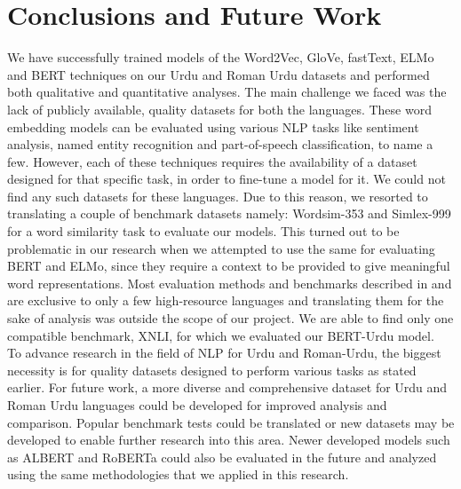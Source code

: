 \documentclass[format=acmsmall,review=true,screen=true]{acmart}
\begin{document}
    \section{Conclusions and Future Work}
   We have successfully trained models of the Word2Vec, GloVe, fastText, ELMo and BERT techniques on our Urdu and Roman Urdu datasets and performed both qualitative and quantitative analyses. The main challenge we faced was the lack of publicly available, quality datasets for both the languages. These word embedding models can be evaluated using various NLP tasks like sentiment analysis, named entity recognition and part-of-speech classification, to name a few. However, each of these techniques requires the availability of a dataset designed for that specific task, in order to fine-tune a model for it. We could not find any such datasets for these languages. Due to this reason, we resorted to translating a couple of benchmark datasets namely: Wordsim-353 and Simlex-999 for a word similarity task to evaluate our models. This turned out to be problematic in our research when we attempted to use the same for evaluating BERT and ELMo, since they require a context to be provided to give meaningful word representations. Most evaluation methods and benchmarks described in \cite{devlin2018bert} and \cite{peters2018deep}  are exclusive to only a few high-resource languages and translating them for the sake of analysis was outside the scope of our project. We are able to find only one compatible benchmark, XNLI, for which we evaluated our BERT-Urdu model. \\
   
To advance research in the field of NLP for Urdu and Roman-Urdu, the biggest necessity is for quality datasets designed to perform various tasks as stated earlier. For future work, a more diverse and comprehensive dataset for Urdu and Roman Urdu languages could be developed for improved analysis and comparison. Popular benchmark tests could be translated or new datasets may be developed to enable further research into this area. Newer developed models such as ALBERT \cite{lan2019albert} and RoBERTa \cite{liu2019roberta} could also be evaluated in the future and analyzed using the same methodologies that we applied in this research. 
    
    
\end{document}
